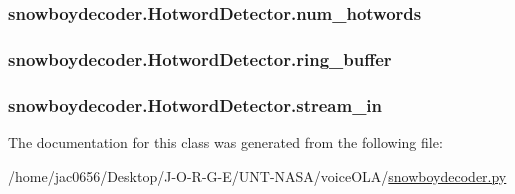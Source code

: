 \subsubsection[{\texorpdfstring{num\+\_\+hotwords}{num_hotwords}}]{\setlength{\rightskip}{0pt plus 5cm}snowboydecoder.\+Hotword\+Detector.\+num\+\_\+hotwords}\hypertarget{classsnowboydecoder_1_1HotwordDetector_a45759e8fb8047abaf3697071cb88364c}{}\label{classsnowboydecoder_1_1HotwordDetector_a45759e8fb8047abaf3697071cb88364c}
\subsubsection[{\texorpdfstring{ring\+\_\+buffer}{ring_buffer}}]{\setlength{\rightskip}{0pt plus 5cm}snowboydecoder.\+Hotword\+Detector.\+ring\+\_\+buffer}\hypertarget{classsnowboydecoder_1_1HotwordDetector_ae5f5881d045e26f9e750b5e03c99f29c}{}\label{classsnowboydecoder_1_1HotwordDetector_ae5f5881d045e26f9e750b5e03c99f29c}
\subsubsection[{\texorpdfstring{stream\+\_\+in}{stream_in}}]{\setlength{\rightskip}{0pt plus 5cm}snowboydecoder.\+Hotword\+Detector.\+stream\+\_\+in}\hypertarget{classsnowboydecoder_1_1HotwordDetector_a2658be70bb0b1939517e24f008d392a2}{}\label{classsnowboydecoder_1_1HotwordDetector_a2658be70bb0b1939517e24f008d392a2}


The documentation for this class was generated from the following file\+:\begin{DoxyCompactItemize}
\item 
/home/jac0656/\+Desktop/\+J-\/\+O-\/\+R-\/\+G-\/\+E/\+U\+N\+T-\/\+N\+A\+S\+A/voice\+O\+L\+A/\hyperlink{snowboydecoder_8py}{snowboydecoder.\+py}\end{DoxyCompactItemize}
